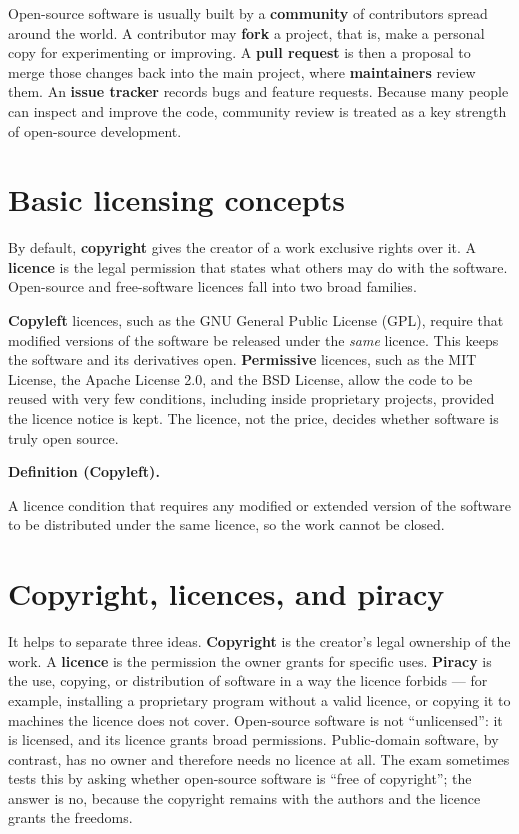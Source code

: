 \documentclass[11pt]{article}
\newenvironment{definitionbox}[1]{%
  \par\noindent\textbf{Definition (#1).}\ \itshape
}{\par\vspace{0.3em}}
\begin{document}
Open-source software is usually built by a \textbf{community} of contributors
spread around the world. A contributor may \textbf{fork} a project, that is,
make a personal copy for experimenting or improving. A \textbf{pull request}
is then a proposal to merge those changes back into the main project, where
\textbf{maintainers} review them. An \textbf{issue tracker} records bugs and
feature requests. Because many people can inspect and improve the code,
community review is treated as a key strength of open-source development.

\section{Basic licensing concepts}
By default, \textbf{copyright} gives the creator of a work exclusive rights
over it. A \textbf{licence} is the legal permission that states what others
may do with the software. Open-source and free-software licences fall into two
broad families.

\textbf{Copyleft} licences, such as the GNU General Public License (GPL),
require that modified versions of the software be released under the
\emph{same} licence. This keeps the software and its derivatives open.
\textbf{Permissive} licences, such as the MIT License, the Apache License 2.0,
and the BSD License, allow the code to be reused with very few conditions,
including inside proprietary projects, provided the licence notice is kept.
The licence, not the price, decides whether software is truly open source.

\begin{definitionbox}{Copyleft}
A licence condition that requires any modified or extended version of the
software to be distributed under the same licence, so the work cannot be
closed.
\end{definitionbox}

\section{Copyright, licences, and piracy}
It helps to separate three ideas. \textbf{Copyright} is the creator's legal
ownership of the work. A \textbf{licence} is the permission the owner grants
for specific uses. \textbf{Piracy} is the use, copying, or distribution of
software in a way the licence forbids --- for example, installing a
proprietary program without a valid licence, or copying it to machines the
licence does not cover. Open-source software is not ``unlicensed'': it is
licensed, and its licence grants broad permissions. Public-domain software,
by contrast, has no owner and therefore needs no licence at all. The exam
sometimes tests this by asking whether open-source software is ``free of
copyright''; the answer is no, because the copyright remains with the authors
and the licence grants the freedoms.
\end{document}
